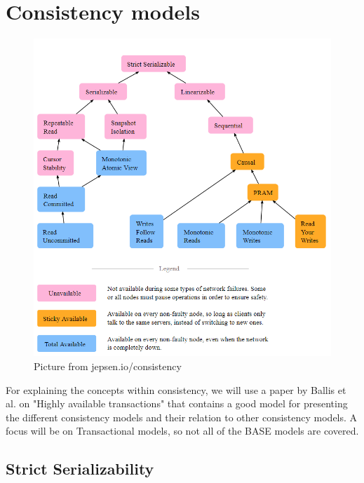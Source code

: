 \documentclass[a4paper,10pt,titlepage]{report}
\begin{document}
\newpage
\section{Consistency models}

\begin{figure}
    \centering
    \includegraphics[scale=0.4]{images/consistency models.PNG}
    \caption{Picture from jepsen.io/consistency}
    \label{fig:jepsenioconsistency}
\end{figure}
For explaining the concepts within consistency, we will use a paper by Ballis et al. on "Highly available transactions"\cite{HighlyAvailableTransactionsVirtuesandLimitations} that contains a good model for presenting the different consistency models and their relation to other consistency models. A focus will be on Transactional models, so not all of the BASE models are covered.\\

\subsection{Strict Serializability}
\end{document}
